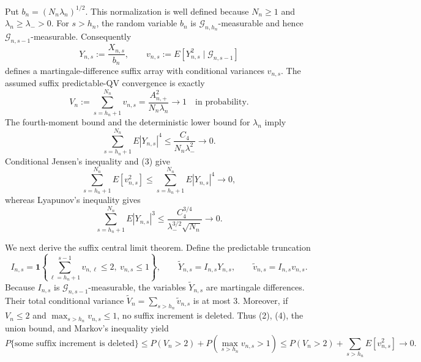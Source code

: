 Put \(b_n=(N_n\lambda_n)^{1/2}\).  This normalization is well defined because \(N_n\ge1\) and \(\lambda_n\ge\lambda_->0\).  For \(s>h_n\), the random variable \(b_n\) is \(\mathcal G_{n,h_n}\)-measurable and hence \(\mathcal G_{n,s-1}\)-measurable.  Consequently
\[
Y_{n,s}:=\frac{X_{n,s}}{b_n},\qquad
v_{n,s}:=E[Y_{n,s}^2\mid\mathcal G_{n,s-1}]
\tag{1}
\]
defines a martingale-difference suffix array with conditional variances \(v_{n,s}\).  The assumed suffix predictable-QV convergence is exactly
\[
V_n:=\sum_{s=h_n+1}^{N_n}v_{n,s}
=\frac{A_{n,+}^2}{N_n\lambda_n}\longrightarrow1
\quad\text{in probability}.
\tag{2}
\]
The fourth-moment bound and the deterministic lower bound for \(\lambda_n\) imply
\[
\sum_{s=h_n+1}^{N_n}E|Y_{n,s}|^4
\le \frac{C_4}{N_n\lambda_-^2}\longrightarrow0.
\tag{3}
\]
Conditional Jensen's inequality and (3) give
\[
\sum_{s=h_n+1}^{N_n}E[v_{n,s}^2]
\le \sum_{s=h_n+1}^{N_n}E|Y_{n,s}|^4\longrightarrow0,
\tag{4}
\]
whereas Lyapunov's inequality gives
\[
\sum_{s=h_n+1}^{N_n}E|Y_{n,s}|^3
\le \frac{C_4^{3/4}}{\lambda_-^{3/2}\sqrt{N_n}}\longrightarrow0.
\tag{5}
\]

We next derive the suffix central limit theorem.  Define the predictable truncation
\[
I_{n,s}=\mathbf1\!\left\{\sum_{\ell=h_n+1}^{s-1}v_{n,\ell}\le2,
\ v_{n,s}\le1\right\},\qquad
\widetilde Y_{n,s}=I_{n,s}Y_{n,s},\qquad
\widetilde v_{n,s}=I_{n,s}v_{n,s}.
\tag{6}
\]
Because \(I_{n,s}\) is \(\mathcal G_{n,s-1}\)-measurable, the variables \(\widetilde Y_{n,s}\) are martingale differences.  Their total conditional variance \(\widetilde V_n=\sum_{s>h_n}\widetilde v_{n,s}\) is at most \(3\).  Moreover, if \(V_n\le2\) and \(\max_{s>h_n}v_{n,s}\le1\), no suffix increment is deleted.  Thus (2), (4), the union bound, and Markov's inequality yield
\[
P\{\text{some suffix increment is deleted}\}
\le P(V_n>2)+P\!\left(\max_{s>h_n}v_{n,s}>1\right)
\le P(V_n>2)+\sum_{s>h_n}E[v_{n,s}^2]
\longrightarrow0.
\tag{7}
\]

